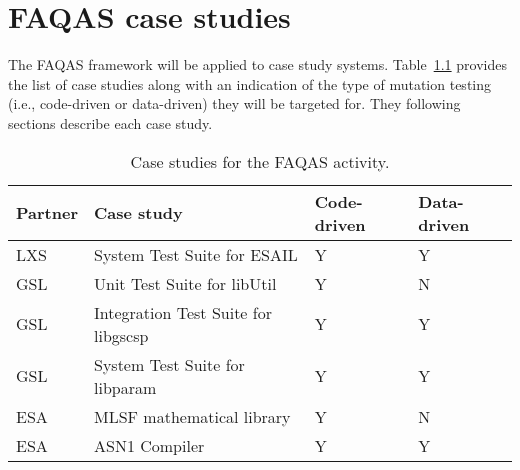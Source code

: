 
\chapter{FAQAS case studies}
\label{chapter:caseStudies}

The FAQAS framework will be applied to  case study systems. Table~\ref{tab:caseStudies} provides the list of case studies along with an indication of the type of mutation testing (i.e., code-driven or data-driven) they will be targeted for. They following sections describe each case study.

\begin{table}[htp]
\caption{Case studies for the FAQAS activity.}
\label{tab:caseStudies}
\begin{center}
\begin{tabular}{|p{1.2cm}|p{6cm}|p{2.5cm}|p{2.5cm}|}
\hline
\textbf{Partner}&\textbf{Case study}&\textbf{Code-driven}&\textbf{Data-driven}\\
\hline
LXS&System Test Suite for ESAIL&Y&Y\\
GSL&Unit Test Suite for libUtil&Y&N\\
GSL&Integration Test Suite for libgscsp&Y&Y\\
GSL&System Test Suite for libparam&Y&Y\\
ESA&MLSF mathematical library&Y&N\\
ESA&ASN1 Compiler&Y&Y\\
\hline
\end{tabular}
\end{center}
\end{table}%

\clearpage










